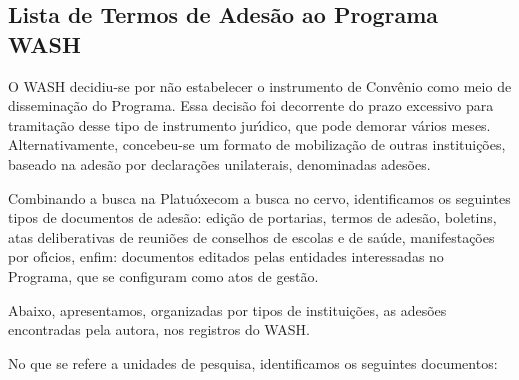 \documentclass[
12pt,		%
openright,	%
twoside,  %
a4paper,			%
chapter=TITLE,		%
english,			%
french,				%
spanish,			%
brazil				%
]{USPSC-classe/USPSC}
\begin{document}
\subsection[Lista de Termos de Ades\~ao ao Programa WASH]{Lista de Termos de Ades\~ao ao Programa WASH}\label{Lista de Termos de Ades\~ao ao Programa WASH}
O WASH decidiu-se por n\~ao estabelecer o instrumento de Conv\^enio como meio de dissemina\c{c}\~ao do Programa. Essa decis\~ao foi decorrente do prazo excessivo para tramita\c{c}\~ao desse tipo de instrumento jur\'{\i}dico, que pode demorar v\'arios meses. Alternativamente, concebeu-se um formato de mobiliza\c{c}\~ao de outras institui\c{c}\~oes, baseado na ades\~ao por declara\c{c}\~oes  unilaterais, denominadas \textquotedbl ades\~oes\textquotedbl .

















Combinando a busca na \textquotedbl Platu\'oxe\textquotedbl  com a busca no cervo, identificamos os seguintes tipos de documentos de ades\~ao:  edi\c{c}\~ao de portarias, termos de ades\~ao, boletins, atas deliberativas de reuni\~oes de conselhos de escolas e de sa\'ude, manifesta\c{c}\~oes por of\'{\i}cios, enfim: documentos editados pelas entidades interessadas no Programa, que se configuram como atos de gest\~ao.

















Abaixo, apresentamos, organizadas por tipos de institui\c{c}\~oes, as ades\~oes encontradas pela autora, nos registros do WASH.

















No que se refere a \textquotedbl unidades de pesquisa\textquotedbl , identificamos os seguintes documentos:
\end{document}
